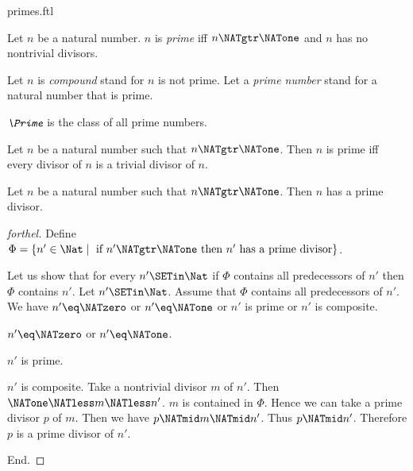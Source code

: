 \documentclass{stex}
\begin{document}
\begin{smodule}{primes.ftl}

\begin{definition}[forthel,id=ARITHMETIC_10_5450464558579712]
  Let $n$ be a natural number.
  $n$ is \emph{prime} iff $n \NATgtr \NATone$ and $n$ has no nontrivial divisors.

  Let $n$ is \emph{compound} stand for $n$ is not prime.
  Let a \emph{prime number} stand for a natural number that is prime.
\end{definition}

\begin{definition}[forthel,id=ARITHMETIC_10_3834705971511296]
  $\emph{\Prime}$ is the class of all prime numbers.
\end{definition}

\begin{proposition}[forthel,id=ARITHMETIC_10_7801379464675328]
  Let $n$ be a natural number such that $n \NATgtr \NATone$.
  Then $n$ is prime iff every divisor of $n$ is a trivial divisor of $n$.
\end{proposition}

\begin{proposition}[forthel,id=ARITHMETIC_10_3606185106210816]
  Let $n$ be a natural number such that $n \NATgtr \NATone$.
  Then $n$ has a prime divisor.
\end{proposition}
\begin{proof}[forthel]
  Define $\Phi = \{ n' \in \Nat \mid\text{ if }n' \NATgtr \NATone\text{ then }n'\text{ has a prime divisor}\}$.

  Let us show that for every $n' \SETin \Nat$ if $\Phi$ contains all
  predecessors of $n'$ then $\Phi$ contains $n'$.
    Let $n' \SETin \Nat$.
    Assume that $\Phi$ contains all predecessors of $n'$.
    We have $n' \eq \NATzero$ or $n' \eq \NATone$ or $n'$ is prime or $n'$ is composite.

    \begin{case}{$n' \eq \NATzero$ or $n' \eq \NATone$.} \end{case}

    \begin{case}{$n'$ is prime.} \end{case}

    \begin{case}{$n'$ is composite.}
      Take a nontrivial divisor $m$ of $n'$.
      Then $\NATone \NATless m \NATless n'$.
      $m$ is contained in $\Phi$.
      Hence we can take a prime divisor $p$ of $m$.
      Then we have $p \NATmid m \NATmid n'$.
      Thus $p \NATmid n'$.
      Therefore $p$ is a prime divisor of $n'$.
    \end{case}
  End.


\end{proof}
\end{smodule}
\end{document}
